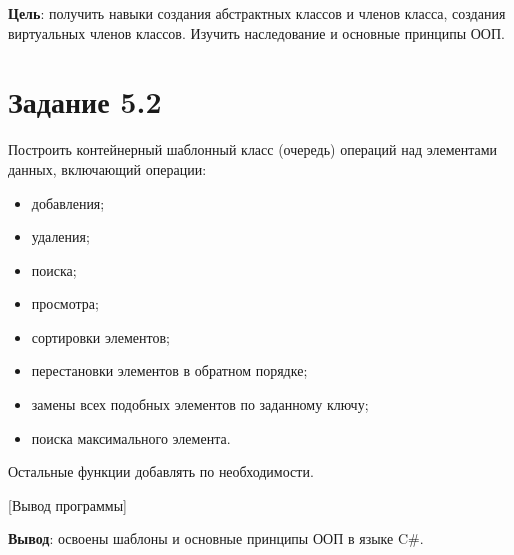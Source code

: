 \documentclass{bsuir}
\newcommand{\csharp}{C{\liberationrm\#}}
\begin{document}
    \maketitle

    \textbf{Цель}: получить навыки создания абстрактных классов и членов класса,
    создания виртуальных членов классов. Изучить наследование и основные принципы
    ООП.

    \section*{Задание 5.2}

    Построить контейнерный шаблонный класс (очередь) операций над элементами
    данных, включающий операции:

    \begin{itemize}
        \item добавления;
        \item удаления;
        \item поиска;
        \item просмотра;
        \item сортировки элементов;
        \item перестановки элементов в обратном порядке;
        \item замены всех подобных элементов по заданному ключу;
        \item поиска максимального элемента.
    \end{itemize}

    Остальные функции добавлять по необходимости.


    [Вывод программы]

    \textbf{Вывод}: освоены шаблоны и основные принципы ООП в языке \csharp.
\end{document}
